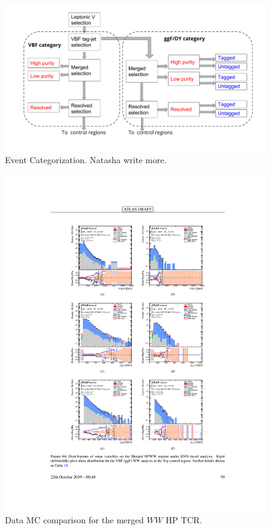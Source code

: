 \begin{figure}[h!]
  \centering
  \includegraphics[width=\hsize]{figures/Analysis/cutflow.pdf}  
  \caption{Event Categorization. Natasha write more.} 

  \label{fig:cutflow}
\end{figure} 
\FloatBarrier


\begin{figure}[h!]
  \centering
  \includegraphics[width=\hsize]{figures/Analysis/datamc/merged_hp_ww_tcr.pdf}
    \caption{Data MC comparison for the merged $WW$ HP TCR.} 
  \label{fig:merged_hp_ww_TCR_datamc}
\end{figure} 
\FloatBarrier


